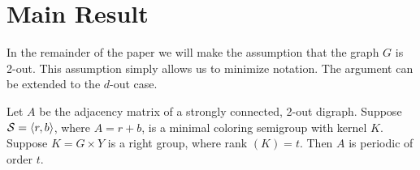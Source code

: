 



\section{Main Result}
\label{sec:4.5}

In the remainder of the paper we will make the assumption that the graph $G$ is 2-out.  This assumption simply allows us to minimize notation.  
The argument can be extended to the $d$-out case.

\begin{theorem}		\label{thm:4.12}
	Let $A$ be the adjacency matrix of a strongly connected, 2-out digraph.
Suppose $\mathcal{S} = \langle r,b \rangle$, where $A = r+b$, is a minimal coloring semigroup
with kernel $K$.  Suppose $K = G \times Y$ is a right group, where rank $(K)=t$.  
Then $A$ is periodic of order $t$.
\end{theorem}

